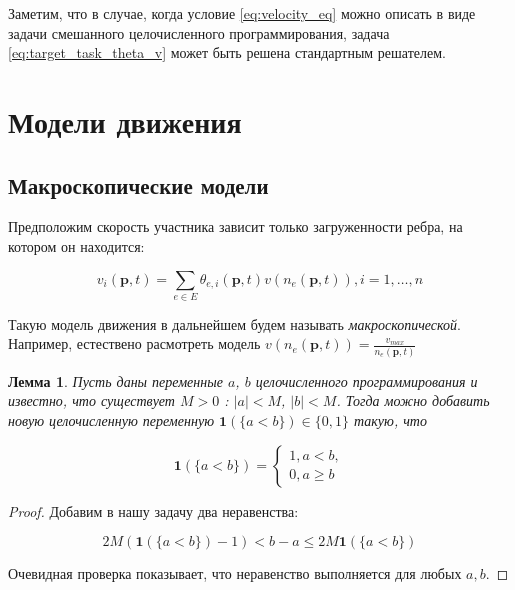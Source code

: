 \documentclass[12pt, a4paper]{article}
\newtheorem{lemma}{Лемма}[section]
\begin{document}
Заметим, что в случае, когда условие \eqref{eq:velocity_eq} можно описать в виде задачи смешанного целочисленного программирования, 
задача \eqref{eq:target_task_theta_v} может быть решена стандартным решателем.

\newpage
\section{Модели движения}

\subsection*{Макроскопические модели}

Предположим скорость участника зависит только загруженности ребра, на котором он находится:

\begin{equation}
	\label{eq:velocity_eq_macro}
	 v_i(\textbf{p}, t) = \sum \limits _{e \in E} \theta_{e, i} (\textbf{p}, t) v (n_e (\textbf{p}, t)),  i = 1, \dots, n
\end{equation}

Такую модель движения в дальнейшем будем называть \textit{макроскопической}.
Например, естествено расмотреть модель $ v (n_e (\textbf{p}, t)) = \frac{v_{max}}{n_e (\textbf{p}, t)}$

\begin{lemma}
	\label{lemma:lt}
	Пусть даны переменные $a$, $b$ целочисленного программирования и известно, что существует $M > 0$ : $|a| < M$, $|b| < M$. Тогда можно добавить новую целочисленную переменную $\textbf{1} (\{a < b\}) \in \{0, 1\}$ такую, что
	
	\begin{equation*}
		\textbf{1} (\{a < b\}) = 
		\begin{cases}
			1, a < b,
			\\
			0, a \ge b
		\end{cases}
	\end{equation*}

\end{lemma}

\begin{proof}
	Добавим в нашу задачу два неравенства:
	
	$$ 2M (\textbf{1} (\{a < b\}) - 1) < b - a \le 2M\textbf{1} (\{a < b\}) $$
	
	Очевидная проверка показывает, что неравенство выполняется для любых $a, b$.
	
	
\end{proof}
\end{document}
